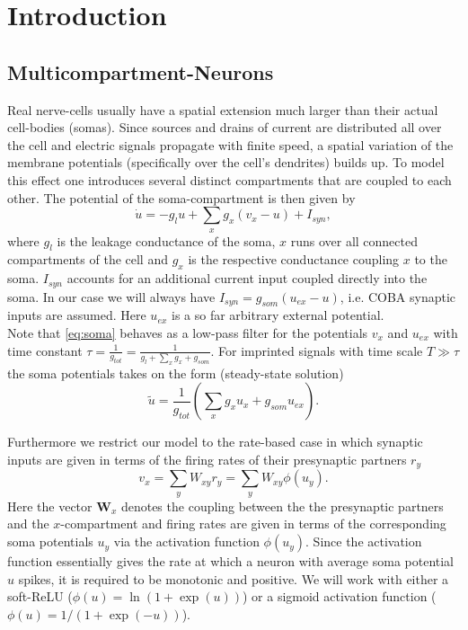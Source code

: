 \documentclass[12pt,a4paper]{article}
\begin{document}
\section{Introduction}
\subsection{Multicompartment-Neurons}
Real nerve-cells usually have a spatial extension much larger than their actual cell-bodies (somas). Since sources and drains of current are distributed all over the cell and electric signals propagate with finite speed, a spatial variation of the membrane potentials (specifically over the cell's dendrites) builds up. To model this effect one introduces several distinct compartments that are coupled to each other. The potential of the soma-compartment is then given by
\begin{equation}
\dot{u} = -g_lu + \sum_xg_x(v_x-u) + I_{syn}, \label{eq:soma}
\end{equation}  
where $g_l$ is the leakage conductance of the soma, $x$ runs over all connected compartments of the cell and $g_x$ is the respective conductance coupling $x$ to the soma. $I_{syn}$ accounts for an additional current input coupled directly into the soma. In our case we will always have $I_{syn} = g_{som}(u_{ex}-u)$, i.e. COBA synaptic inputs are assumed. Here $u_{ex}$ is a so far arbitrary external potential.\\
Note that \eqref{eq:soma} behaves as a low-pass filter for the potentials $v_x$ and $u_{ex}$ with time constant $\tau = \frac{1}{g_{tot}} = \frac{1}{g_l + \sum_x g_x + g_{som}}$. For imprinted signals with time scale $T\gg\tau$ the soma potentials takes on the form (steady-state solution)
\begin{equation}
\tilde{u} = \frac{1}{g_{tot}}\left(\sum_x g_xu_x + g_{som}u_{ex}\right). \label{eq:steady}
\end{equation}

Furthermore we restrict our model to the rate-based case in which synaptic inputs are given in terms of the firing rates of their presynaptic partners $r_y$
\begin{equation}
v_x = \sum_yW_{xy}r_y = \sum_yW_{xy}\phi(u_y).
\end{equation}
Here the vector $\bm{W}_x$ denotes the coupling between the the presynaptic partners and the $x$-compartment and firing rates are given in terms of the corresponding soma potentials $u_y$ via the activation function $\phi(u_y)$. Since the activation function essentially gives the rate at which a neuron with average soma potential $u$ spikes, it is required to be monotonic and positive. We will work with either a soft-ReLU ($\phi(u) = \ln(1+\exp(u))$) or a sigmoid activation function ($\phi(u) = 1/(1 + \exp(-u))$).
\end{document}
